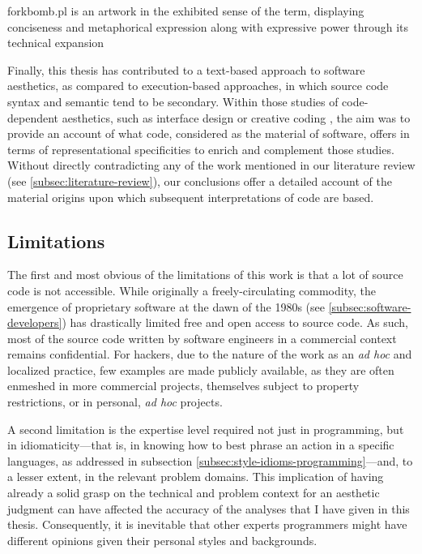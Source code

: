\begin{listing}
    \inputminted{perl}{./corpus/forkbomb.pl}
    \caption{forkbomb.pl is an artwork in the exhibited sense of the term, displaying conciseness and metaphorical expression along with expressive power through its technical expansion}
    \label{code:forkbomb}
\end{listing}

Finally, this thesis has contributed to a text-based approach to software aesthetics, as compared to execution-based approaches, in which source code syntax and semantic tend to be secondary. Within those studies of code-dependent aesthetics, such as interface design \citep{fishwick_aesthetic_2000} or creative coding \citep{cox_aesthetic_2020}, the aim was to provide an account of what code, considered as the material of software, offers in terms of representational specificities to enrich and complement those studies. Without directly contradicting any of the work mentioned in our literature review (see \ref{subsec:literature-review}), our conclusions offer a detailed account of the material origins upon which subsequent interpretations of code are based.

\subsection{Limitations}
\label{subsec:conclusion-limitations}

The first and most obvious of the limitations of this work is that a lot of source code is not accessible. While originally a freely-circulating commodity, the emergence of proprietary software at the dawn of the 1980s (see \ref{subsec:software-developers}) has drastically limited free and open access to source code. As such, most of the source code written by software engineers in a commercial context remains confidential. For hackers, due to the nature of the work as an \emph{ad hoc} and localized practice, few examples are made publicly available, as they are often enmeshed in more commercial projects, themselves subject to property restrictions, or in personal, \emph{ad hoc} projects.

A second limitation is the expertise level required not just in programming, but in idiomaticity—that is, in knowing how to best phrase an action in a specific languages, as addressed in subsection \ref{subsec:style-idioms-programming}—and, to a lesser extent, in the relevant problem domains. This implication of having already a solid grasp on the technical and problem context for an aesthetic judgment can have affected the accuracy of the analyses that I have given in this thesis. Consequently, it is inevitable that other experts programmers might have different opinions given their personal styles and backgrounds.

